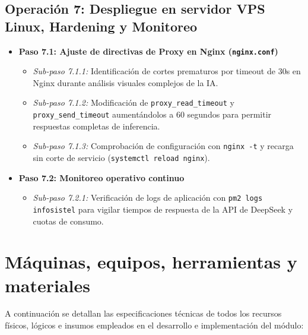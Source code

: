 \documentclass[11pt,a4paper]{article}
\begin{document}
\subsection{Operación 7: Despliegue en servidor VPS Linux, Hardening y Monitoreo}
\begin{itemize}
    \item \textbf{Paso 7.1: Ajuste de directivas de Proxy en Nginx (\texttt{nginx.conf})}
    \begin{itemize}
        \item \textit{Sub-paso 7.1.1:} Identificación de cortes prematuros por timeout de 30s en Nginx durante análisis visuales complejos de la IA.
        \item \textit{Sub-paso 7.1.2:} Modificación de \texttt{proxy\_read\_timeout} y \texttt{proxy\_send\_timeout} aumentándolos a 60 segundos para permitir respuestas completas de inferencia.
        \item \textit{Sub-paso 7.1.3:} Comprobación de configuración con \texttt{nginx -t} y recarga sin corte de servicio (\texttt{systemctl reload nginx}).
    \end{itemize}
    \item \textbf{Paso 7.2: Monitoreo operativo continuo}
    \begin{itemize}
        \item \textit{Sub-paso 7.2.1:} Verificación de logs de aplicación con \texttt{pm2 logs infosistel} para vigilar tiempos de respuesta de la API de DeepSeek y cuotas de consumo.
    \end{itemize}
\end{itemize}

\newpage

\section{Máquinas, equipos, herramientas y materiales}

A continuación se detallan las especificaciones técnicas de todos los recursos físicos, lógicos e insumos empleados en el desarrollo e implementación del módulo:
\end{document}
